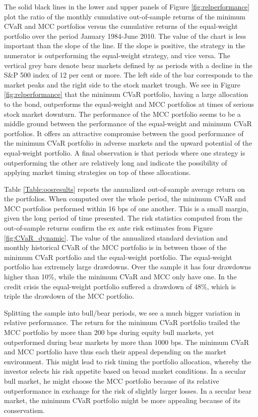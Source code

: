 \documentclass[12pt,a4paper]{article}
\begin{document}
The solid black lines in the lower and upper panels of Figure \ref{fig:relperformance} plot the ratio of the monthly cumulative out-of-sample returns of the minimum CVaR and MCC portfolios versus the cumulative returns of the equal-weight portfolio over the period January 1984-June 2010. The value of the chart is less important than the slope of the line. If the slope is positive, the strategy in the numerator is outperforming the equal-weight strategy, and vice versa. The vertical grey bars denote bear markets defined by \citet{Ellis2005} as periods with a decline in the S\&P 500 index of 12 per cent or more. The left side of the bar corresponds to the market peaks and the right side to the stock market trough.  We see in Figure \ref{fig:relperformance} that the minimum CVaR portfolio, having a large allocation to the bond, outperforms the equal-weight and MCC portfolios at times of serious stock market downturn. The performance of the MCC portfolio seems to be a middle ground between the performance of the equal-weight and minimum CVaR portfolios. It offers an attractive compromise between the good performance of the minimum CVaR portfolio in adverse markets and the upward potential of the equal-weight portfolio. A final observation is that periods where one strategy is outperforming the other are relatively long and indicate the possibility of applying market timing strategies on top of these allocations.

Table \ref{Table:oosresults} reports the annualized out-of-sample average return on the portfolios. When computed over the whole period, the minimum CVaR and MCC portfolios performed within 16 bps of one another. This is a small margin, given the long period of time presented. The risk statistics computed from the out-of-sample returns confirm the ex ante risk estimates from Figure \ref{fig:CVaR_dynamic}.  The value of the annualized standard deviation and monthly historical CVaR of the MCC portfolio is in between those of the minimum CVaR portfolio and the equal-weight portfolio.   The equal-weight portfolio has extremely large drawdowns. Over the sample it has four drawdowns higher than 10\%, while the minimum CVaR and MCC only have one. In the credit crisis the equal-weight portfolio suffered a drawdown of 48\%, which is triple the drawdown of the MCC portfolio.

Splitting the sample into bull/bear periods, we see a much bigger variation in relative performance. The return for the minimum CVaR portfolio trailed the MCC portfolio by more than 200 bps during equity bull markets, yet outperformed during bear markets by more than 1000 bps. The minimum CVaR and MCC portfolio have thus each their appeal depending on the market environment. This might lead to risk timing the portfolio allocation, whereby the investor selects his risk appetite based on broad market conditions. In a secular bull market, he might choose the MCC portfolio because of its relative outperformance in exchange for the risk of slightly larger losses. In a secular bear market, the minimum CVaR portfolio might be more appealing because of its conservatism.
\end{document}
